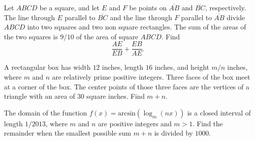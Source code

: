 \begin{question}[name={2013 AIME I, \href{https://artofproblemsolving.com/community/c4p2969807}{Problem 3}}]
	Let $ABCD$ be a square, and let $E$ and $F$ be points on $\overline{AB}$ and $\overline{BC}$, respectively. The line through $E$ parallel to $\overline{BC}$ and the line through $F$ parallel to $\overline{AB}$ divide $ABCD$ into two squares and two non square rectangles. The sum of the areas of the two squares is ${9}/{10}$ of the area of square $ABCD$. Find $$\frac{AE}{EB} + \frac{EB}{AE}.$$
\end{question}


%	










\begin{question}[name={2013 AIME I, \href{https://artofproblemsolving.com/community/c4p2969814}{Problem 7}}]
	A rectangular box has width $12$ inches, length $16$ inches, and height ${m}/{n}$ inches, where $m$ and $n$ are relatively prime positive integers. Three faces of the box meet at a corner of the box. The center points of those three faces are the vertices of a triangle with an area of $30$ square inches. Find $m+n$.
\end{question}


%	












\begin{question}[name={2013 AIME I, \href{https://artofproblemsolving.com/community/c4p2969815}{Problem 8}}]
	The domain of the function $f(x) = \text{arcsin}(\log_{m}(nx))$ is a closed interval of length ${1}/{2013}$, where $m$ and $n$ are positive integers and $m > 1$. Find the remainder when the smallest possible sum $m+n$ is divided by $1000$.
\end{question}


%	













